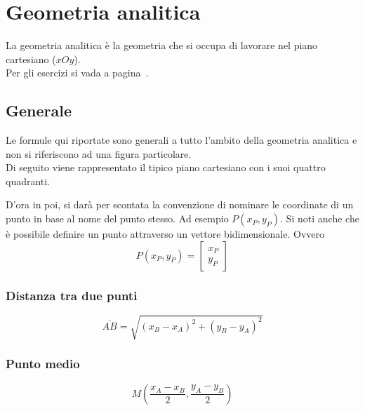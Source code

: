 
\section{Geometria analitica}\label{sec:geomanal}
La geometria analitica è la geometria che si occupa di lavorare nel piano cartesiano ($xOy$).\\
Per gli esercizi si vada a pagina~\pageref{ex:geomanal}.

\subsection{Generale}
Le formule qui riportate sono generali a tutto l'ambito della geometria analitica e non si riferiscono
ad una figura particolare.\\
Di seguito viene rappresentato il tipico piano cartesiano con i suoi quattro quadranti.
\begin{center}
\end{center}
D'ora in poi, si darà per scontata la convenzione di nominare le coordinate di un punto in base al nome
del punto stesso. Ad esempio $P(x_P, y_P)$. Si noti anche che è possibile definire un punto attraverso
un vettore bidimensionale. Ovvero
\begin{equation*}
P(x_P,y_P) = \begin{bmatrix}
x_P\\y_P
\end{bmatrix}
\end{equation*}

\subsubsection{Distanza tra due punti}
\begin{equation*}
\overline{AB} = \sqrt{(x_B-x_A)^2+(y_B-y_A)^2}
\end{equation*}

\subsubsection{Punto medio}
\begin{equation*}
M\left(\frac{x_A-x_B}{2}, \frac{y_A-y_B}{2}\right)
\end{equation*}


